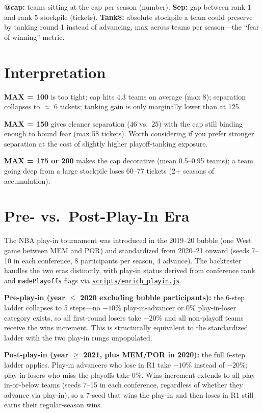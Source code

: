 \documentclass[10pt,letterpaper]{article}
\begin{document}
{\small
\textbf{@cap:} teams sitting at the cap per season (number). \textbf{Sep:} gap between rank 1 and rank 5 stockpile (tickets). \textbf{Tank\$:} absolute stockpile a team could preserve by tanking round 1 instead of advancing, max across teams per season---the ``fear of winning'' metric.
}

\section*{Interpretation}

\textbf{MAX = 100} is too tight: cap hits 4.3 teams on average (max 8); separation collapses to $\approx$ 6 tickets; tanking gain is only marginally lower than at 125.

\textbf{MAX = 150} gives cleaner separation (46 vs.\ 25) with the cap still binding enough to bound fear (max 58 tickets). Worth considering if you prefer stronger separation at the cost of slightly higher playoff-tanking exposure.

\textbf{MAX = 175 or 200} makes the cap decorative (mean 0.5--0.95 teams); a team going deep from a large stockpile loses 60--77 tickets (2+ seasons of accumulation).

\section*{Pre- vs.\ Post-Play-In Era}

The NBA play-in tournament was introduced in the 2019--20 bubble (one West game between MEM and POR) and standardized from 2020--21 onward (seeds 7--10 in each conference, 8 participants per season, 4 advance). The backtester handles the two eras distinctly, with play-in status derived from conference rank and \texttt{madePlayoffs} flags via \href{../scripts/enrich_playin.js}{\texttt{scripts/enrich\_playin.js}}.

\textbf{Pre-play-in (year $\leq$ 2020 excluding bubble participants):} the 6-step ladder collapses to 5 steps---no $-10\%$ play-in-advancer or $0\%$ play-in-loser category exists, so all first-round losers take $-20\%$ and all non-playoff teams receive the wins increment. This is structurally equivalent to the standardized ladder with the two play-in rungs unpopulated.

\textbf{Post-play-in (year $\geq$ 2021, plus MEM/POR in 2020):} the full 6-step ladder applies. Play-in advancers who lose in R1 take $-10\%$ instead of $-20\%$; play-in losers who miss the playoffs take $0\%$. Wins increment extends to all play-in-or-below teams (seeds 7--15 in each conference, regardless of whether they advance via play-in), so a 7-seed that wins the play-in and then loses in R1 still earns their regular-season wins.
\end{document}
